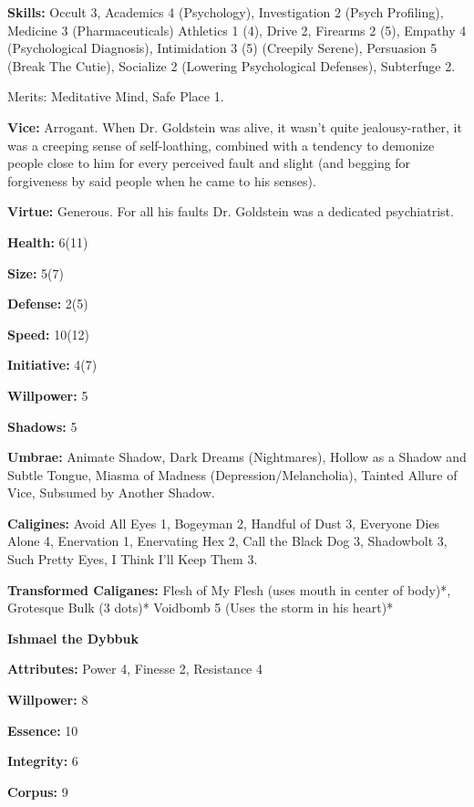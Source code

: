 \noindent \textbf{Skills:} Occult 3, Academics 4 (Psychology), Investigation 2 (Psych Profiling), Medicine 3 (Pharmaceuticals) Athletics 1 (4), Drive 2, Firearms 2 (5), Empathy 4 (Psychological Diagnosis), Intimidation 3 (5) (Creepily Serene), Persuasion 5 (Break The Cutie), Socialize 2 (Lowering Psychological Defenses), Subterfuge 2.

Merits: Meditative Mind, Safe Place 1.

\noindent \textbf{Vice:} Arrogant. When Dr. Goldstein was alive, it wasn't quite jealousy-rather, it was a creeping sense of self-loathing, combined with a tendency to demonize people close to him for every perceived fault and slight (and begging for forgiveness by said people when he came to his senses). 

\noindent \textbf{Virtue:} Generous. For all his faults Dr. Goldstein was a dedicated psychiatrist.

\noindent \textbf{Health:} 6(11)

\noindent \textbf{Size:} 5(7)

\noindent \textbf{Defense:} 2(5)

\noindent \textbf{Speed:} 10(12)

\noindent \textbf{Initiative:} 4(7)

\noindent \textbf{Willpower:} 5

\noindent \textbf{Shadows:} 5

\noindent \textbf{Umbrae:} Animate Shadow, Dark Dreams (Nightmares), Hollow as a Shadow and Subtle Tongue, Miasma of Madness (Depression/Melancholia), Tainted Allure of Vice, Subsumed by Another Shadow.

\noindent \textbf{Caligines:} Avoid All Eyes 1, Bogeyman 2, Handful of Dust 3, Everyone Dies Alone 4, Enervation 1, Enervating Hex 2, Call the Black Dog 3, Shadowbolt 3, Such Pretty Eyes, I Think I'll Keep Them 3.

\noindent \textbf{Transformed Caliganes:} Flesh of My Flesh (uses mouth in center of body)*, Grotesque Bulk (3 dots)* Voidbomb 5 (Uses the storm in his heart)*

\noindent \textbf{Ishmael the Dybbuk}

\noindent \textbf{Attributes:} Power 4, Finesse 2, Resistance 4

\noindent \textbf{Willpower:} 8

\noindent \textbf{Essence:} 10

\noindent \textbf{Integrity:} 6

\noindent \textbf{Corpus:} 9

